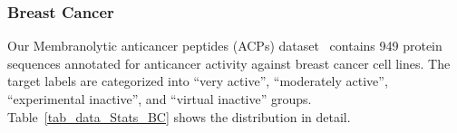 \documentclass[]{Liebert_Author_revised}
\begin{document}




\subsubsection{Breast Cancer}
Our Membranolytic anticancer peptides (ACPs) dataset~\citeauthor{Grisoni2019} contains 949 protein sequences annotated for anticancer activity against breast cancer cell lines. The target labels are categorized into ``very active'', ``moderately active'', ``experimental inactive'', and ``virtual inactive'' groups. Table~\ref{tab_data_Stats_BC} shows the distribution in detail.
\end{document}
